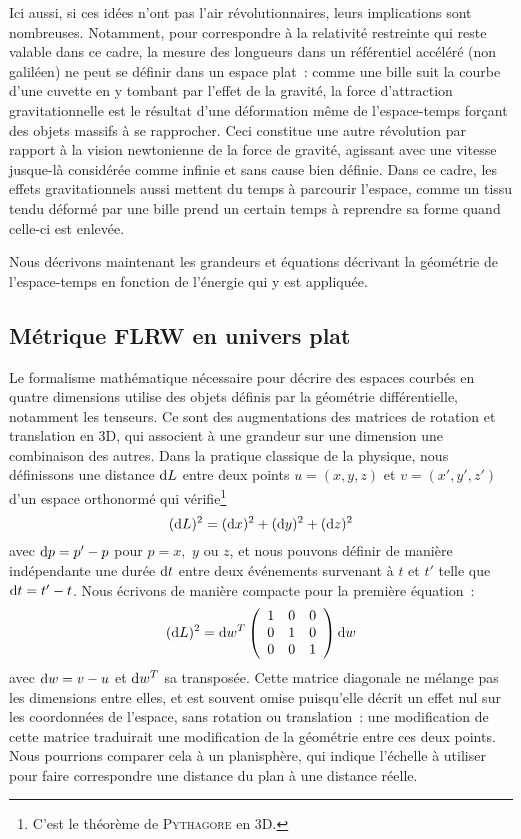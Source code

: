 \documentclass[../main/main.tex]{subfiles}
\begin{document}
Ici aussi, si ces idées n'ont pas l'air révolutionnaires, leurs implications
sont nombreuses. Notamment, pour correspondre à la relativité restreinte qui
reste valable dans ce cadre, la mesure des longueurs dans un référentiel
accéléré (non galiléen) ne peut se définir dans un espace plat~: comme une bille
suit la courbe d'une cuvette en y tombant par l'effet de la gravité, la force
d'attraction gravitationnelle est le résultat d'une déformation même de
l'espace-temps forçant des objets massifs à se rapprocher. Ceci constitue une
autre révolution par rapport à la vision newtonienne de la force de gravité,
agissant avec une vitesse jusque-là considérée comme infinie et sans cause bien
définie. Dans ce cadre, les effets gravitationnels aussi mettent du temps à
parcourir l'espace, comme un tissu tendu déformé par une bille prend un certain
temps à reprendre sa forme quand celle-ci est enlevée.

Nous décrivons maintenant les grandeurs et équations décrivant la géométrie de
l'espace-temps en fonction de l'énergie qui y est appliquée.

\subsection{Métrique FLRW en univers plat}\label{ssec:cons}

Le formalisme mathématique nécessaire pour décrire des espaces courbés en
quatre dimensions utilise des objets définis par la géométrie différentielle,
notamment les tenseurs. Ce sont des augmentations des matrices de rotation et
translation en 3D, qui associent à une grandeur sur une dimension une
combinaison des autres. Dans la pratique classique de la physique, nous
définissons une distance $\mathrm{d} L$ entre deux points $u=(x,y,z)$ et $v=(x',y',z')$
d'un espace orthonormé qui vérifie\footnote{C'est le théorème de
\textsc{Pythagore} en 3D.}
\begin{equation}
    (\mathrm{d} L)^2 = (\mathrm{d} x)^2 + (\mathrm{d} y)^2 + (\mathrm{d} z)^2
\end{equation}
avec $\mathrm{d} p = p'-p$ pour $p = x,$ $y$ ou $z$, et nous pouvons définir de manière
indépendante une durée $\mathrm{d} t$ entre deux événements survenant à $t$ et $t'$
telle que $\mathrm{d} t = t'-t$. Nous écrivons de manière compacte pour la première
équation~:
\begin{equation}
    (\mathrm{d} L)^2 = \mathrm{d} w^T\left(\begin{array}{c c c}
            1 & 0 & 0\\
            0 & 1 & 0\\
            0 & 0 & 1\\
    \end{array}\right)\mathrm{d} w
\end{equation}
avec $\mathrm{d} w = v-u$ et $\mathrm{d} w^T$ sa transposée. Cette matrice diagonale ne mélange
pas les dimensions entre elles, et est souvent omise puisqu'elle décrit un effet
nul sur les coordonnées de l'espace, sans rotation ou translation~: une
modification de cette matrice traduirait une modification de la géométrie entre
ces deux points. Nous pourrions comparer cela à un planisphère, qui indique
l'échelle à utiliser pour faire correspondre une distance du plan à une distance
réelle.
\end{document}
